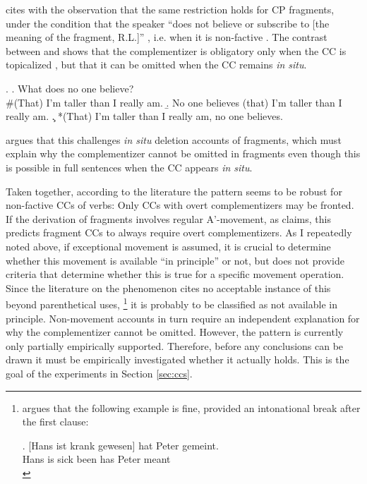 \citet{merchant2004} cites \citet{morgan1973} with the observation that the same restriction holds for CP fragments, under the condition that the speaker ``does not believe or subscribe to [the meaning of the fragment, R.L.]'' \citep[690]{merchant2004}, i.e. when it is non-factive \Next[a]. The contrast between \Next[b] and \Next[c] shows that the complementizer is obligatory only when the CC is topicalized \Next[c], but that it can be omitted when the CC remains \textit{in situ}. 

\ex.
\a. What does no one believe? \hfill \citep[690]{merchant2004}\\
\mbox{}\hspace{-.45em}\#(That) I’m taller than I really am.
\b. No one believes (that) I'm taller than I really am. \label{ex:merchant-cc-insitu}
\c. *(That) I’m taller than I really am, no one believes. \label{ex:merchant-cc-fronted}

\citeauthor{merchant2004} argues that this challenges \textit{in situ} deletion accounts of fragments, which must explain why the complementizer cannot be omitted in fragments even though this is possible in full sentences when the CC appears \textit{in situ}.

Taken together, according to the literature the pattern seems to be robust for non-factive CCs of verbs: Only CCs with overt complementizers may be fronted. If the derivation of fragments involves regular A'-movement, as \citet{merchant2004} claims, this predicts fragment CCs to always require overt complementizers. As I repeatedly noted above, if exceptional movement is assumed, it is crucial to determine whether this movement is available ``in principle'' or not, but \citet{weir2014} does not provide criteria that determine whether this is true for a specific movement operation. Since the literature on the phenomenon cites no acceptable instance of this beyond parenthetical uses,%
\footnote{\citet{webelhuth1992} argues that the following example is fine, provided an intonational break after the first clause:

\exg. [Hans ist krank gewesen] hat Peter gemeint.\\
Hans is sick been has Peter meant\\
 

}\afterfn%
%
it is probably to be classified as not available in principle. Non-movement accounts in turn require an independent explanation for why the complementizer cannot be omitted. However, the pattern is currently only partially empirically supported. Therefore, before any conclusions can be drawn it must be empirically investigated whether it actually holds. This is the goal of the experiments in Section \ref{sec:ccs}. 

